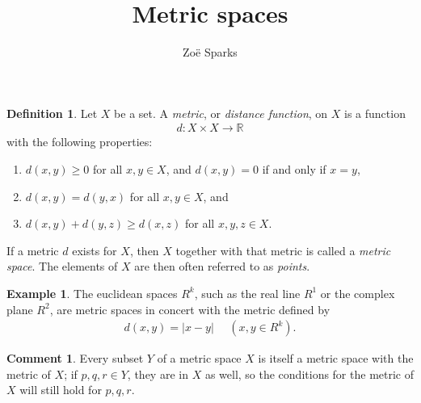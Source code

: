 \documentclass[12pt]{article}
\title{Metric spaces}
\author{Zoë Sparks}
\begin{document}
\theoremstyle{definition}

\newtheorem{thm}{Theorem}
\newtheorem*{nthm}{Theorem}
\newtheorem{sthm}{}[thm]
\newtheorem{lemma}{Lemma}[thm]
\newtheorem*{nlemma}{Lemma}
\newtheorem{cor}{Corollary}[thm]
\newtheorem*{prop}{Property}
\newtheorem*{defn}{Definition}
\newtheorem*{comm}{Comment}
\newtheorem*{exm}{Example}

\maketitle

\begin{defn}
  Let $X$ be a set. A \textit{metric}, or \textit{distance function}, on $X$ is a
  function
  \begin{align*}
    d: X \times X \to \mathbb{R}
  \end{align*}
  with the following properties:
  \begin{enumerate}
    \item
      $d(x,y) \geq 0$ for all $x,y \in X$, and $d(x,y) = 0$ if and only if $x = y$,
    \item
      $d(x,y) = d(y,x)$ for all $x,y \in X$, and
    \item
      $d(x,y) + d(y,z) \geq d(x,z)$ for all $x,y,z \in X$.
  \end{enumerate}
  If a metric $d$ exists for $X$, then $X$ together with that metric is called a
  \textit{metric space}. The elements of $X$ are then often referred to as
  \textit{points}.
\end{defn}

\begin{exm}
  The euclidean spaces $R^k$, such as the real line $R^1$ or the complex plane $R^2$,
  are metric spaces in concert with the metric defined by
  \begin{align*}
    d(x,y) = |x - y|\ \ \ \ \ \ (x,y \in R^k).
  \end{align*}
\end{exm}

\begin{comm}
  Every subset $Y$ of a metric space $X$ is itself a metric space with the metric of
  $X$; if $p,q,r \in Y$, they are in $X$ as well, so the conditions for the metric of
  $X$ will still hold for $p,q,r$.
\end{comm}
\end{document}
